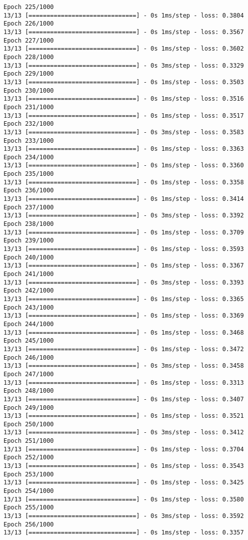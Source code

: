 \documentclass[11pt]{article}
\begin{document}
\begin{Verbatim}[commandchars=\\\{\}]
Epoch 225/1000
13/13 [==============================] - 0s 1ms/step - loss: 0.3804
Epoch 226/1000
13/13 [==============================] - 0s 1ms/step - loss: 0.3567
Epoch 227/1000
13/13 [==============================] - 0s 1ms/step - loss: 0.3602
Epoch 228/1000
13/13 [==============================] - 0s 3ms/step - loss: 0.3329
Epoch 229/1000
13/13 [==============================] - 0s 1ms/step - loss: 0.3503
Epoch 230/1000
13/13 [==============================] - 0s 1ms/step - loss: 0.3516
Epoch 231/1000
13/13 [==============================] - 0s 1ms/step - loss: 0.3517
Epoch 232/1000
13/13 [==============================] - 0s 3ms/step - loss: 0.3583
Epoch 233/1000
13/13 [==============================] - 0s 1ms/step - loss: 0.3363
Epoch 234/1000
13/13 [==============================] - 0s 1ms/step - loss: 0.3360
Epoch 235/1000
13/13 [==============================] - 0s 1ms/step - loss: 0.3358
Epoch 236/1000
13/13 [==============================] - 0s 1ms/step - loss: 0.3414
Epoch 237/1000
13/13 [==============================] - 0s 3ms/step - loss: 0.3392
Epoch 238/1000
13/13 [==============================] - 0s 1ms/step - loss: 0.3709
Epoch 239/1000
13/13 [==============================] - 0s 1ms/step - loss: 0.3593
Epoch 240/1000
13/13 [==============================] - 0s 1ms/step - loss: 0.3367
Epoch 241/1000
13/13 [==============================] - 0s 3ms/step - loss: 0.3393
Epoch 242/1000
13/13 [==============================] - 0s 1ms/step - loss: 0.3365
Epoch 243/1000
13/13 [==============================] - 0s 1ms/step - loss: 0.3369
Epoch 244/1000
13/13 [==============================] - 0s 1ms/step - loss: 0.3468
Epoch 245/1000
13/13 [==============================] - 0s 1ms/step - loss: 0.3472
Epoch 246/1000
13/13 [==============================] - 0s 3ms/step - loss: 0.3458
Epoch 247/1000
13/13 [==============================] - 0s 1ms/step - loss: 0.3313
Epoch 248/1000
13/13 [==============================] - 0s 1ms/step - loss: 0.3407
Epoch 249/1000
13/13 [==============================] - 0s 1ms/step - loss: 0.3521
Epoch 250/1000
13/13 [==============================] - 0s 3ms/step - loss: 0.3412
Epoch 251/1000
13/13 [==============================] - 0s 1ms/step - loss: 0.3704
Epoch 252/1000
13/13 [==============================] - 0s 1ms/step - loss: 0.3543
Epoch 253/1000
13/13 [==============================] - 0s 1ms/step - loss: 0.3425
Epoch 254/1000
13/13 [==============================] - 0s 1ms/step - loss: 0.3580
Epoch 255/1000
13/13 [==============================] - 0s 3ms/step - loss: 0.3592
Epoch 256/1000
13/13 [==============================] - 0s 1ms/step - loss: 0.3357

\end{Verbatim}
\end{document}
